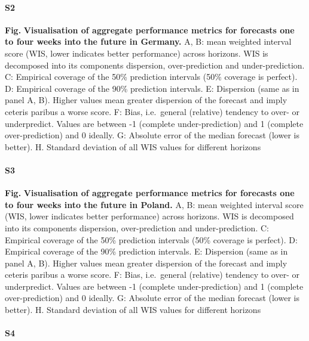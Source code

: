 \documentclass[10pt,letterpaper]{article}
\begin{document}
\paragraph{S2}

\textbf{Fig.} \label{fig:agg-performance-all-Germany}
\textbf{Visualisation of aggregate performance metrics for forecasts one to four weeks into the future in Germany.}
A, B: mean weighted interval score (WIS, lower indicates better
performance) across horizons. WIS is decomposed into its components
dispersion, over-prediction and under-prediction. C: Empirical coverage
of the 50\% prediction intervals (50\% coverage is perfect). D:
Empirical coverage of the 90\% prediction intervals. E: Dispersion (same
as in panel A, B). Higher values mean greater dispersion of the forecast
and imply ceteris paribus a worse score. F: Bias, i.e.~general
(relative) tendency to over- or underpredict. Values are between -1
(complete under-prediction) and 1 (complete over-prediction) and 0
ideally. G: Absolute error of the median forecast (lower is better). H.
Standard deviation of all WIS values for different horizons

\paragraph{S3}

\textbf{Fig.} \label{fig:agg-performance-all-Poland}
\textbf{Visualisation of aggregate performance metrics for forecasts one to four weeks into the future in Poland.}
A, B: mean weighted interval score (WIS, lower indicates better
performance) across horizons. WIS is decomposed into its components
dispersion, over-prediction and under-prediction. C: Empirical coverage
of the 50\% prediction intervals (50\% coverage is perfect). D:
Empirical coverage of the 90\% prediction intervals. E: Dispersion (same
as in panel A, B). Higher values mean greater dispersion of the forecast
and imply ceteris paribus a worse score. F: Bias, i.e.~general
(relative) tendency to over- or underpredict. Values are between -1
(complete under-prediction) and 1 (complete over-prediction) and 0
ideally. G: Absolute error of the median forecast (lower is better). H.
Standard deviation of all WIS values for different horizons

\paragraph{S4}
\end{document}
